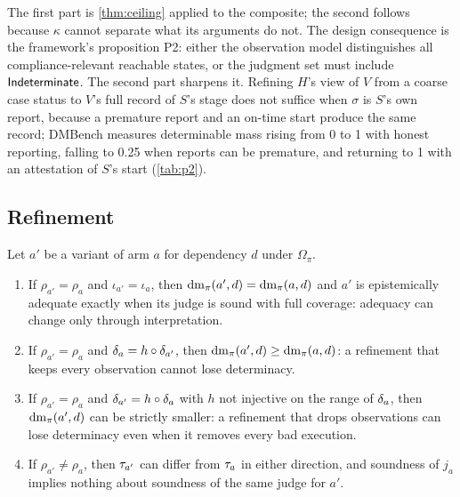 The first part is \cref{thm:ceiling} applied to the composite; the second follows because $\kappa$ cannot separate what its arguments do not. The design consequence is the framework's proposition P2: either the observation model distinguishes all compliance-relevant reachable states, or the judgment set must include $\mathsf{Indeterminate}$. The second part sharpens it. Refining $H$'s view of $V$ from a coarse case status to $V$'s full record of $S$'s stage does not suffice when $\sigma$ is $S$'s own report, because a premature report and an on-time start produce the same record; DMBench measures determinable mass rising from 0 to 1 with honest reporting, falling to 0.25 when reports can be premature, and returning to 1 with an attestation of $S$'s start (\cref{tab:p2}).

\subsection{Refinement}

\begin{theorem}
\label{thm:p3}
Let $a'$ be a variant of arm $a$ for dependency $d$ under $\Omega_\pi$.
\begin{enumerate}
\item If $\rho_{a'} = \rho_a$ and $\iota_{a'} = \iota_a$, then $\operatorname{dm}_\pi(a', d) = \operatorname{dm}_\pi(a, d)$ and $a'$ is epistemically adequate exactly when its judge is sound with full coverage: adequacy can change only through interpretation.
\item If $\rho_{a'} = \rho_a$ and $\delta_a = h \circ \delta_{a'}$, then $\operatorname{dm}_\pi(a', d) \geq \operatorname{dm}_\pi(a, d)$: a refinement that keeps every observation cannot lose determinacy.
\item If $\rho_{a'} = \rho_a$ and $\delta_{a'} = h \circ \delta_a$ with $h$ not injective on the range of $\delta_a$, then $\operatorname{dm}_\pi(a', d)$ can be strictly smaller: a refinement that drops observations can lose determinacy even when it removes every bad execution.
\item If $\rho_{a'} \neq \rho_a$, then $\tau_{a'}$ can differ from $\tau_a$ in either direction, and soundness of $j_a$ implies nothing about soundness of the same judge for $a'$.
\end{enumerate}
\end{theorem}

